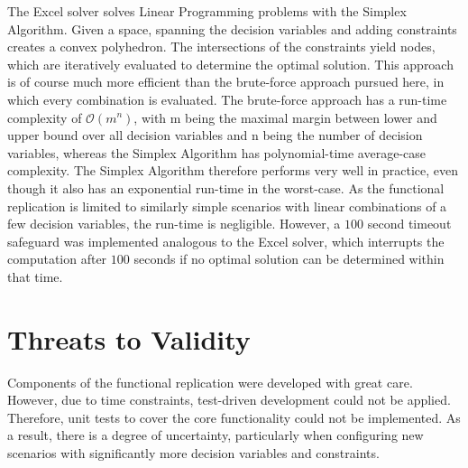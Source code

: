 \documentclass[sigconf, nonacm]{acmart}
\begin{document}
The Excel solver solves Linear Programming problems with the Simplex Algorithm. Given a space, spanning the decision variables and adding constraints creates a convex polyhedron. The intersections of the constraints yield nodes, which are iteratively evaluated to determine the optimal solution. This approach is of course much more efficient than the brute-force approach pursued here, in which every combination is evaluated. The brute-force approach has a run-time complexity of $\mathcal{O}(m^n)$, with m being the maximal margin between lower and upper bound over all decision variables and n being the number of decision variables, whereas the Simplex Algorithm has polynomial-time average-case complexity. The Simplex Algorithm therefore performs very well in practice, even though it also has an exponential run-time in the worst-case. As the functional replication is limited to similarly simple scenarios with linear combinations of a few decision variables, the run-time is negligible. However, a $100$ second timeout safeguard was implemented analogous to the Excel solver, which interrupts the computation after $100$ seconds if no optimal solution can be determined within that time.



\section{Threats to Validity}
Components of the functional replication were developed with great care. However, due to time constraints, test-driven development could not be applied. Therefore, unit tests to cover the core functionality could not be implemented. As a result, there is a degree of uncertainty, particularly when configuring new scenarios with significantly more decision variables and constraints.





\end{document}
